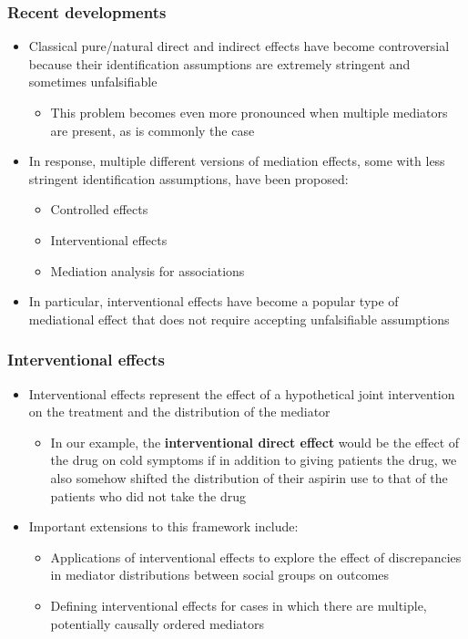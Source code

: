 \documentclass{beamer}
\begin{document}
\begin{frame}
\frametitle{Recent developments}
\begin{itemize}
\item Classical pure/natural direct and indirect effects have become controversial because their identification assumptions are extremely stringent and sometimes unfalsifiable ~\citep{vanderweelevansteelandt2009}
\begin{itemize}
\item This problem becomes even more pronounced when multiple mediators are present, as is commonly the case ~\citep{avinetal2005}
\end{itemize}
\item In response, multiple different versions of mediation effects, some with less stringent identification assumptions, have been proposed:
\begin{itemize}
\item Controlled effects
\item Interventional effects ~\citep{vanderweeleetal2014}
\item Mediation analysis for associations ~\citep{kuhaetal2021}
\end{itemize}
\item In particular, interventional effects have become a popular type of mediational effect that does not require accepting unfalsifiable assumptions
\end{itemize}
\end{frame}

\begin{frame}
\frametitle{Interventional effects}
\begin{itemize}
\item Interventional effects represent the effect of a hypothetical joint intervention on the treatment and the distribution of the mediator
\begin{itemize}
\item In our example, the \textbf{interventional direct effect} would be the effect of the drug on cold symptoms if in addition to giving patients the drug, we also somehow shifted the distribution of their aspirin use to that of the patients who did not take the drug
\end{itemize}
\item Important extensions to this framework include:
\begin{itemize}
\item Applications of interventional effects to explore the effect of discrepancies in mediator distributions between social groups on outcomes ~\citep{vanderweelerobinson2014}
\item Defining interventional effects for cases in which there are multiple, potentially causally ordered mediators ~\citep{vansteelandtdaniel2017}
\end{itemize}
\end{itemize}
\end{frame}
\end{document}
